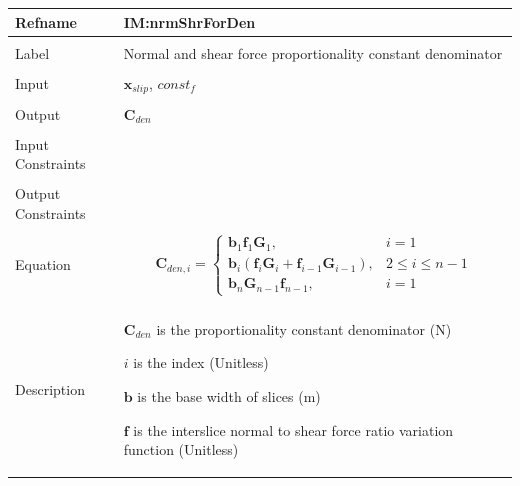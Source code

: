 \documentclass[12pt]{article}
\begin{document}
\noindent \begin{minipage}{\textwidth}
          \begin{tabular}{>{\raggedright}p{}>{\raggedright\arraybackslash}p{}}
          \toprule \textbf{Refname} & \textbf{IM:nrmShrForDen}
          \label{IM:nrmShrForDen}
          \\ \midrule \\
          Label & Normal and shear force proportionality constant denominator
          \\ \midrule \\
          Input & ${\mathbf{x}_{slip}}$, $const_f$
          \\ \midrule \\
          Output & ${\mathbf{C}_{den}}$
          \\ \midrule \\
          Input Constraints & 
          \\ \midrule \\
          Output Constraints & 
          \\ \midrule \\
          Equation & \begin{displaymath}
                     {\mathbf{C}_{den,i}}=\begin{cases}
                                          {\mathbf{b}}_{1} {\mathbf{f}}_{1} {\mathbf{G}}_{1}, & i=1\\
{\mathbf{b}}_{i} \left({\mathbf{f}}_{i} {\mathbf{G}}_{i}+{\mathbf{f}}_{i-1} {\mathbf{G}}_{i-1}\right), & 2\leq{}i\leq{}n-1\\
{\mathbf{b}}_{n} {\mathbf{G}}_{n-1} {\mathbf{f}}_{n-1}, & i=1
                                          \end{cases}
                     \end{displaymath}
          \\ \midrule \\
          Description & \begin{symbDescription}
                        \item{${\mathbf{C}_{den}}$ is the proportionality constant denominator (N)}
                        \item{$i$ is the index (Unitless)}
                        \item{$\mathbf{b}$ is the base width of slices (m)}
                        \item{$\mathbf{f}$ is the interslice normal to shear force ratio variation function (Unitless)}

\end{symbDescription}
\end{tabular}
\end{minipage}
\end{document}
